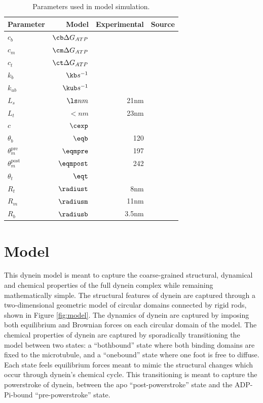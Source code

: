 \documentclass[9pt,twocolumn,twoside]{pnas-new}
\begin{document}
\begin{table}[tbhp]
\centering
\caption{Parameters used in model simulation.}
\label{tab:params}
\begin{tabular}{lrrr}
Parameter & Model & Experimental & Source \\
\midrule
$c_b$ & $\cb \Delta G_{ATP}$ &  & \\
$c_m$ & $\cm \Delta G_{ATP}$ &  & \\
$c_t$ & $\ct \Delta G_{ATP}$ &  & \\
$k_b$ & $\kb s^{-1}$&  & \\
$k_{ub}$ & $\kub s^{-1}$ & & \\
$L_s$ & $\ls nm$ & 21nm & \cite{burgess-paper, 3vkh-cite, carter-paper}\\
$L_t$ & $\lt nm$ & 23nm & \cite{burgess-paper, 3vkh-cite, carter-paper}\\
$c$ & $\cexp$ & & \\
$\theta_b$ & $\eqb$ &  120 & \cite{leschziner} \\
$\theta_m^{\mbox{pre}}$ & $\eqmpre$ &  197 & \cite{burgess-paper}\\
$\theta_m^{\mbox{post}}$ & $\eqmpost$ & 242 & \cite{burgess-paper}\\
$\theta_t$ & $\eqt$ &  & \\
$R_t$ & $\radiust$ & 8nm & \cite{burgess-paper}\\
$R_m$ & $\radiusm$ & 11nm & \cite{burgess-paper}\\
$R_b$ & $\radiusb$ & 3.5nm & \cite{burgess-paper}\\

\bottomrule
\end{tabular}

\end{table}

\section{Model}
This dynein model is meant to capture the coarse-grained structural, dynamical and chemical properties of the full dynein complex while remaining mathematically simple. The structural features of dynein are captured through a two-dimensional geometric model of circular domains connected by rigid rods, shown in Figure \ref{fig:model}. The dynamics of dynein are captured by imposing both equilibrium and Brownian forces on each circular domain of the model. The chemical properties of dynein are captured by sporadically transitioning the model between two states: a ``bothbound'' state where both binding domains are fixed to the microtubule, and a ``onebound'' state where one foot is free to diffuse. Each state feels equilibrium forces meant to mimic the structural changes which occur through dynein's chemical cycle. This transitioning is meant to capture the powerstroke of dynein, between the apo ``post-powerstroke'' state and the ADP-Pi-bound ``pre-powerstroke'' state.
\end{document}
